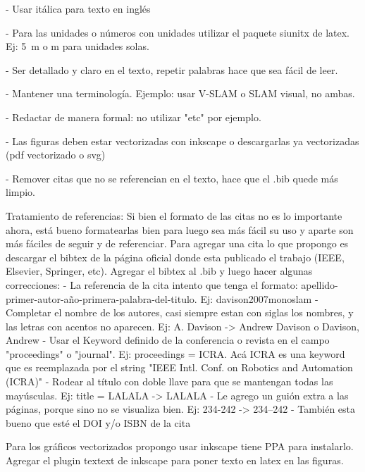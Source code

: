 \documentclass[a4paper,	11pt]{article}
\begin{document}
- Usar itálica para texto en inglés

- Para las unidades o números con unidades utilizar el paquete siunitx de latex. Ej: \SI{5}{\meter} o \si{\meter} para unidades solas.

- Ser detallado y claro en el texto, repetir palabras hace que sea fácil de leer.

- Mantener una terminología. Ejemplo: usar V-SLAM o SLAM visual, no ambas.

- Redactar de manera formal: no utilizar "etc" por ejemplo.

- Las figuras deben estar vectorizadas con inkscape o descargarlas ya vectorizadas (pdf vectorizado o svg)

- Remover citas que no se referencian en el texto, hace que el .bib quede más limpio.

Tratamiento de referencias:
Si bien el formato de las citas no es lo importante ahora, está bueno formatearlas bien para luego sea más fácil su uso y aparte son más fáciles de seguir y de referenciar. Para agregar una cita lo que propongo es descargar el bibtex de la página oficial donde esta publicado el trabajo (IEEE, Elsevier, Springer, etc). Agregar el bibtex al .bib y luego hacer algunas correcciones:
- La referencia de la cita intento que tenga el formato: apellido-primer-autor-año-primera-palabra-del-titulo. Ej: davison2007monoslam
- Completar el nombre de los autores, casi siempre estan con siglas los nombres, y las letras con acentos no aparecen. Ej: A. Davison -> Andrew Davison o Davison, Andrew
- Usar el Keyword definido de la conferencia o revista en el campo "proceedings" o "journal". Ej: proceedings = ICRA. Acá ICRA es una keyword que es reemplazada por el string "IEEE Intl. Conf. on Robotics and Automation (ICRA)"
- Rodear al título con doble llave para que se mantengan todas las mayúsculas. Ej: title = {LALALA} -> {{LALALA}}
- Le agrego un guión extra a las páginas, porque sino no se visualiza bien. Ej: 234-242 -> 234--242
- También esta bueno que esté el DOI y/o ISBN de la cita

Para los gráficos vectorizados propongo usar inkscape tiene PPA para instalarlo.
Agregar el plugin textext de inkscape para poner texto en latex en las figuras.
\end{document}
